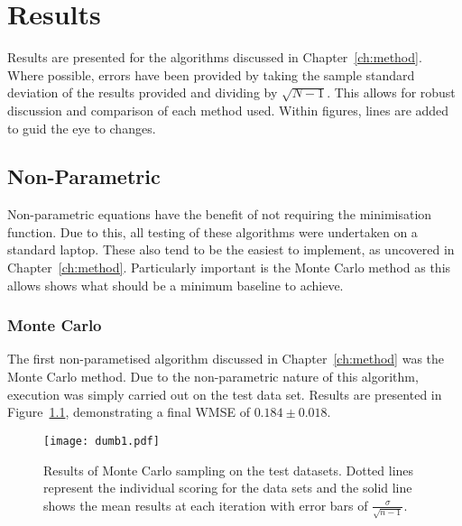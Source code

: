 \chapter{Results}










\graphicspath{{Chapter4/Figs/Vector/}{Chapter4/Figs/}}
Results are presented for the algorithms discussed in Chapter~\ref{ch:method}. Where possible, errors have been provided by taking the sample standard deviation of the results provided and dividing by $\sqrt{N-1}$. This allows for robust discussion and comparison of each method used. Within figures, lines are added to guid the eye to changes.

\section{Non-Parametric}
Non-parametric equations have the benefit of not requiring the minimisation function. Due to this, all testing of these algorithms were undertaken on a standard laptop. These also tend to be the easiest to implement, as uncovered in Chapter~\ref{ch:method}. Particularly important is the Monte Carlo method as this allows shows what should be a minimum baseline to achieve.

\subsection{Monte Carlo}
The first non-parametised algorithm discussed in Chapter~\ref{ch:method} was the Monte Carlo method. Due to the non-parametric nature of this algorithm, execution was simply carried out on the test data set. Results are presented in Figure~\ref{fig:MCTestSet}, demonstrating a final WMSE of ${0.184\pm{}0.018}$.

\begin{figure}[H]
    \begin{center}
        \texttt{[image: dumb1.pdf]}
        \caption[Monte Carlo]{Results of Monte Carlo sampling on the test datasets. Dotted lines represent the individual scoring for the data sets and the solid line shows the mean results at each iteration with error bars of $\frac{\sigma{}}{\sqrt{n-1}}$.}
        \label{fig:MCTestSet}
    \end{center}
\end{figure}

